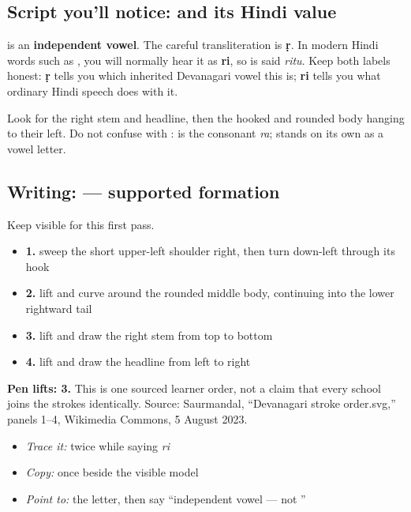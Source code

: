 \subsection*{Script you'll notice:  and its Hindi value}
\textbf{} is an \textbf{independent vowel}. The careful transliteration is \textbf{ṛ}. In modern Hindi words such as \textbf{}, you will normally hear it as \textbf{ri}, so \textbf{} is said \emph{ritu}. Keep both labels honest: \textbf{ṛ} tells you which inherited Devanagari vowel this is; \textbf{ri} tells you what ordinary Hindi speech does with it.

Look for the right stem and headline, then the hooked and rounded body hanging to their left. Do not confuse \textbf{} with \textbf{}: \textbf{} is the consonant \emph{ra}; \textbf{} stands on its own as a vowel letter.

\subsection*{Writing:  — supported formation}

Keep \textbf{} visible for this first pass.

\begin{itemize}
\raggedright
  \item \textbf{1.} sweep the short upper-left shoulder right, then turn down-left through its hook
  \item \textbf{2.} lift and curve around the rounded middle body, continuing into the lower rightward tail
  \item \textbf{3.} lift and draw the right stem from top to bottom
  \item \textbf{4.} lift and draw the headline from left to right
\end{itemize}

\textbf{Pen lifts: 3.} This is one sourced learner order, not a claim that every school joins the strokes identically. Source: Saurmandal, “Devanagari  stroke order.svg,” panels 1–4, Wikimedia Commons, 5 August 2023.

\begin{itemize}
\raggedright
  \item \emph{Trace it:}  twice while saying \emph{ri}
  \item \emph{Copy:}  once beside the visible model
  \item \emph{Point to:} the letter, then say “independent vowel — not ”
\end{itemize}

